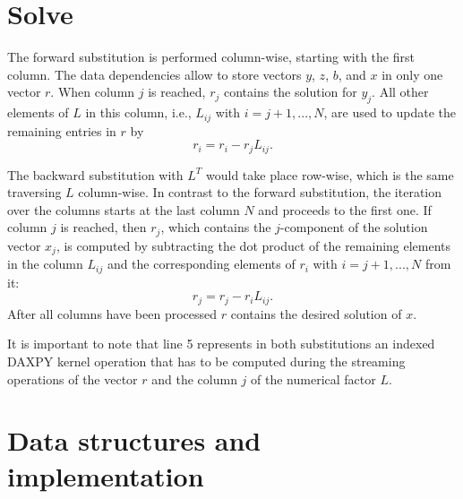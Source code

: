 \section{Solve}

The forward substitution is performed column-wise, starting with the first column.
The data dependencies allow to store vectors $y$, $z$, $b$, and $x$ in only one vector $r$. When column $j$ is reached, $r_j$ contains the solution for $y_j$. All other elements of $L$ in this column, i.e., $L_{ij}$ with $i=j+1,...,N$, are used to update the remaining entries in $r$ by
$$
    r_i = r_i - r_j L_{ij}.
$$

The backward substitution with $L^T$ would take place row-wise, which is the same traversing $L$ column-wise. In contrast to the forward substitution, the iteration over the columns starts at the last column $N$ and proceeds to the first one. If column $j$ is reached, then $r_j$, which contains the $j$-component of the solution vector $x_j$, is computed by subtracting the dot product of the remaining elements in the column $L_{ij}$ and the corresponding elements of $r_i$ with $i = j + 1,...,N$ from it:
$$
    r_j = r_j - r_i L_{ij}.
$$
After all columns have been processed $r$ contains the desired solution of $x$.




It is important to note that line 5 represents in both substitutions an indexed
DAXPY kernel operation that has to be computed during the streaming operations
of the vector $r$ and the column $j$ of the numerical factor $L$.



\section{Data structures and implementation }

